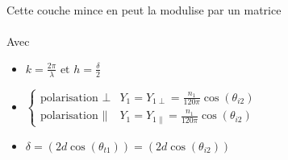 \documentclass[12pt]{book}
\begin{document}
            \begin{center}
                \begin{minipage}{0.64\linewidth}
                    Cette couche mince en peut la modulise par un matrice \\
                    \\
                    Avec \begin{itemize}
                        \item $ k=\frac{2\pi}{\lambda} \text{ et } h = \frac{\delta}{2}$\\
                        \item $\begin{cases}
                            \text{polarisation $\perp$} & Y_1 = Y_{1\perp}=\frac{n_1}{120\pi}\cos(\theta_{i2})\\
                            \text{polarisation $\parallel$} & Y_1 = Y_{1\parallel}=\frac{n_1}{120\pi}\cos(\theta_{i2})
                            \end{cases}$
                        \item $\delta = (2d\cos(\theta_{t1}))=(2d\cos(\theta_{i2}))$
                    \end{itemize}
                    

\end{minipage}
\end{center}
\end{document}
